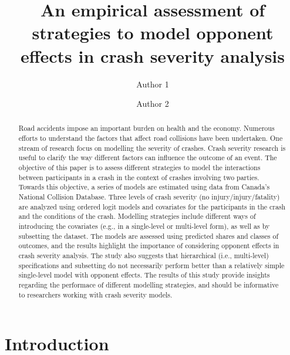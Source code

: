 \documentclass[]{elsarticle} %
\begin{document}
\begin{frontmatter}

  \title{An empirical assessment of strategies to model opponent effects in crash
severity analysis}
    \author[Some University]{Author 1}
    \author[Another University]{Author 2}
      \address[Some University]{Address}
    \address[Another University]{Address}
    
  \begin{abstract}
  Road accidents impose an important burden on health and the economy.
  Numerous efforts to understand the factors that affect road collisions
  have been undertaken. One stream of research focus on modelling the
  severity of crashes. Crash severity research is useful to clarify the
  way different factors can influence the outcome of an event. The
  objective of this paper is to assess different strategies to model the
  interactions between participants in a crash in the context of crashes
  involving two parties. Towards this objective, a series of models are
  estimated using data from Canada's National Collision Database. Three
  levels of crash severity (no injury/injury/fatality) are analyzed using
  ordered logit models and covariates for the participants in the crash
  and the conditions of the crash. Modelling strategies include different
  ways of introducing the covariates (e.g., in a single-level or
  multi-level form), as well as by subsetting the dataset. The models are
  assessed using predicted shares and classes of outcomes, and the results
  highlight the importance of considering opponent effects in crash
  severity analysis. The study also suggests that hierarchical (i.e.,
  multi-level) specifications and subsetting do not necessarily perform
  better than a relatively simple single-level model with opponent
  effects. The results of this study provide insights regarding the
  performace of different modelling strategies, and should be informative
  to researchers working with crash severity models.
  \end{abstract}
  
 \end{frontmatter}

\hypertarget{introduction}{%
\section{Introduction}\label{introduction}}
\end{document}
